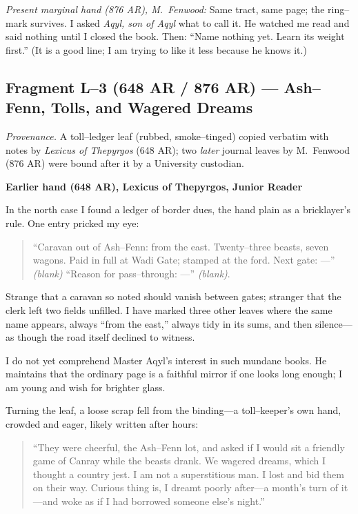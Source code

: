 \documentclass[11pt]{article}
\numberwithin{equation}{section} %
\theoremstyle{plain} %
\theoremstyle{definition} %
\theoremstyle{remark} %
\begin{document}
\medskip
\noindent\textit{Present marginal hand (876 AR), M.\ Fenwood:} Same tract, same page; the ring–mark survives. I asked \textit{Aqyl, son of Aqyl} what to call it. He watched me read and said nothing until I closed the book. Then: “Name nothing yet. Learn its weight first.” (It is a good line; I am trying to like it less because he knows it.)

\subsection{Fragment L--3 (648 AR / 876 AR) — Ash–Fenn, Tolls, and Wagered Dreams}
\label{frag:l3}

\noindent\textit{Provenance.} A toll–ledger leaf (rubbed, smoke–tinged) copied verbatim with notes by \textit{Lexicus of Thepyrgos} (648 AR); two \textit{later} journal leaves by M.\ Fenwood (876 AR) were bound after it by a University custodian.

\medskip
\noindent\textbf{Earlier hand (648 AR), Lexicus of Thepyrgos, Junior Reader}

In the north case I found a ledger of border dues, the hand plain as a bricklayer’s rule. One entry pricked my eye:

\begin{quote}\small
“Caravan out of Ash–Fenn: from the east. Twenty–three beasts, seven wagons. Paid in full at Wadi Gate; stamped at the ford. Next gate: —” \textit{(blank)} “Reason for pass–through: —” \textit{(blank)}.
\end{quote}

Strange that a caravan so noted should vanish between gates; stranger that the clerk left two fields unfilled. I have marked three other leaves where the same name appears, always “from the east,” always tidy in its sums, and then silence—as though the road itself declined to witness.

I do not yet comprehend Master Aqyl’s interest in such mundane books. He maintains that the ordinary page is a faithful mirror if one looks long enough; I am young and wish for brighter glass.

Turning the leaf, a loose scrap fell from the binding—a toll–keeper’s own hand, crowded and eager, likely written after hours:

\begin{quote}\small
“They were cheerful, the Ash–Fenn lot, and asked if I would sit a friendly game of Canray while the beasts drank. We wagered dreams, which I thought a country jest. I am not a superstitious man. I lost and bid them on their way. Curious thing is, I dreamt poorly after—a month’s turn of it—and woke as if I had borrowed someone else’s night.”
\end{quote}
\end{document}
